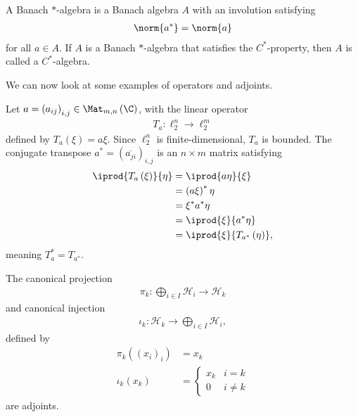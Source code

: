 \documentclass[10pt]{mypackage}
\begin{document}
\begin{definition}
  A Banach $\ast$-algebra is a Banach algebra $A$ with an involution satisfying
  \begin{align*}
    \norm{a^{\ast}} = \norm{a}
  \end{align*}
  for all $a\in A$. If $A$ is a Banach $\ast$-algebra that satisfies the $C^{\ast}$-property, then $A$ is called a $C^{\ast}$-algebra.
\end{definition}
We can now look at some examples of operators and adjoints.
\begin{example}
  Let $a = \left(a_{ij}\right)_{i,j}\in \Mat_{m,n}\left(\C\right)$, with the linear operator
  \begin{align*}
    T_{a}\colon \ell_{2}^{n}\rightarrow \ell_{2}^{m}
  \end{align*}
  defined by $T_a\left(\xi\right) = a\xi$. Since $\ell_2^{n}$ is finite-dimensional, $T_a$ is bounded. The conjugate transpose $a^{\ast} = \left(\overline{a_{ji}}\right)_{i,j}$ is an $n\times m$ matrix satisfying
  \begin{align*}
    \iprod{T_{a}\left(\xi\right)}{\eta} &= \iprod{a\eta}{\xi}\\
                                        &= \left(a\xi\right)^{\ast}\eta\\
                                        &= \xi^{\ast}a^{\ast}\eta\\
                                        &= \iprod{\xi}{a^{\ast}\eta}\\
                                        &= \iprod{\xi}{T_{a^{\ast}}\left(\eta\right)},
  \end{align*}
  meaning $T_{a}^{\ast} = T_{a^{\ast}}$.
\end{example}
\begin{example}
  The canonical projection
  \begin{align*}
    \pi_k\colon \bigoplus_{i\in I}\mathcal{H}_i \rightarrow \mathcal{H}_k
  \end{align*}
  and canonical injection
  \begin{align*}
    \iota_k\colon \mathcal{H}_k \rightarrow \bigoplus_{i\in I}\mathcal{H}_i,
  \end{align*}
  defined by
  \begin{align*}
    \pi_k\left(\left(x_i\right)_i\right) &= x_k\\
    \iota_k\left(x_k\right) &= \begin{cases}
      x_k & i=k\\
      0 & i\neq k
    \end{cases}
  \end{align*}
  are adjoints.
\end{example}
\end{document}
